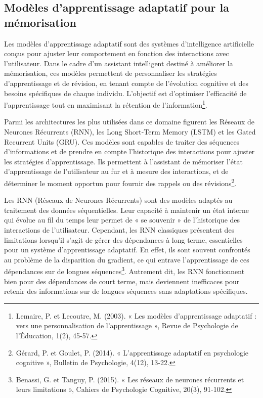 \documentclass[11pt,a4paper]{report}
\begin{document}
\subsection{Modèles d’apprentissage adaptatif pour la mémorisation}

Les modèles d’apprentissage adaptatif sont des systèmes d’intelligence artificielle conçus pour ajuster leur comportement en fonction des interactions avec l'utilisateur. Dans le cadre d'un assistant intelligent destiné à améliorer la mémorisation, ces modèles permettent de personnaliser les stratégies d’apprentissage et de révision, en tenant compte de l'évolution cognitive et des besoins spécifiques de chaque individu. L’objectif est d'optimiser l'efficacité de l'apprentissage tout en maximisant la rétention de l'information\footnote{Lemaire, P. et Lecoutre, M. (2003). « Les modèles d’apprentissage adaptatif : vers une personnalisation de l’apprentissage », Revue de Psychologie de l’Éducation, 1(2), 45-57.}.

Parmi les architectures les plus utilisées dans ce domaine figurent les Réseaux de Neurones Récurrents (RNN), les Long Short-Term Memory (LSTM) et les Gated Recurrent Units (GRU). Ces modèles sont capables de traiter des séquences d'informations et de prendre en compte l’historique des interactions pour ajuster les stratégies d’apprentissage. Ils permettent à l’assistant de mémoriser l’état d’apprentissage de l’utilisateur au fur et à mesure des interactions, et de déterminer le moment opportun pour fournir des rappels ou des révisions\footnote{Gérard, P. et Goulet, P. (2014). « L'apprentissage adaptatif en psychologie cognitive », Bulletin de Psychologie, 4(12), 13-22.}.

Les RNN (Réseaux de Neurones Récurrents) sont des modèles adaptés au traitement des données séquentielles. Leur capacité à maintenir un état interne qui évolue au fil du temps leur permet de « se souvenir » de l’historique des interactions de l’utilisateur. Cependant, les RNN classiques présentent des limitations lorsqu'il s'agit de gérer des dépendances à long terme, essentielles pour un système d’apprentissage adaptatif. En effet, ils sont souvent confrontés au problème de la disparition du gradient, ce qui entrave l'apprentissage de ces dépendances sur de longues séquences\footnote{Benassi, G. et Tanguy, P. (2015). « Les réseaux de neurones récurrents et leurs limitations », Cahiers de Psychologie Cognitive, 20(3), 91-102.}. Autrement dit, les RNN fonctionnent bien pour des dépendances de court terme, mais deviennent inefficaces pour retenir des informations sur de longues séquences sans adaptations spécifiques.
\end{document}
